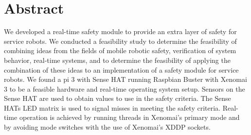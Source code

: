 \documentclass[12pt]{scrreprt}
\begin{document}
\newpage
\chapter*{Abstract}

We developed a real-time safety module to provide an extra layer of safety for service robots.
We conducted a feasibility study to determine the feasibility of combining ideas from the fields of mobile robotic safety, verification of system behavior, real-time systems, and to determine the feasibility of applying the combination of these ideas to an implementation of a safety module for service robots. We found a \gls{pi} 3 with Sense HAT running Raspbian Buster with Xenomai 3 to be a feasible hardware and real-time operating system setup. Sensors on the Sense HAT are used to obtain values to use in the safety criteria. The Sense HATs LED matrix is used to signal misses in meeting the safety criteria. Real-time operation is achieved by running threads in Xenomai's primary mode and by avoiding mode switches with the use of Xenomai's XDDP sockets.


\tableofcontents
\listoffigures
\listoftables
\newpage
{}
\end{document}

